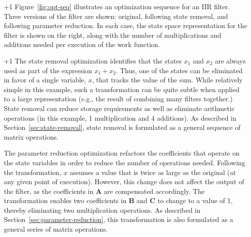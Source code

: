 \looseness+1 Figure~\ref{fig:opt-seq} illustrates an optimization sequence for an
IIR filter.  Three versions of the filter are shown: original,
following state removal, and following parameter reduction.  In each
case, the state space representation for the filter is shown on the
right, along with the number of multiplications and additions needed
per execution of the work function.

\looseness+1 The state removal optimization identifies that the states
$x_1$ and $x_2$ are always used as part of the expression $x_1 + x_2$.
Thus, one of the states can be eliminated in favor of a single
variable, $x$, that tracks the value of the sum.  While relatively
simple in this example, such a transformation can be quite subtle when
applied to a large representation (e.g., the result of combining many
filters together.)  State removal can reduce storage requirements as
well as eliminate arithmetic operations (in this example, 1
multiplication and 4 additions).  As described in
Section~\ref{sec:state-removal}, state removal is formulated as a
general sequence of matrix operations.

The parameter reduction optimization refactors the coefficients that
operate on the state variables in order to reduce the number of
operations needed.  Following the transformation, $x$ assumes a value
that is twice as large as the original (at any given point of
execution).  However, this change does not affect the output of the
filter, as the coefficients in $\mathbf{A}$ are compensated
accordingly.  The transformation enables two coefficients in
$\mathbf{B}$ and $\mathbf{C}$ to change to a value of 1, thereby
eliminating two multiplication operations.  As described in
Section~\ref{sec:parameter-reduction}, this transformation is also
formulated as a general series of matrix operations.
